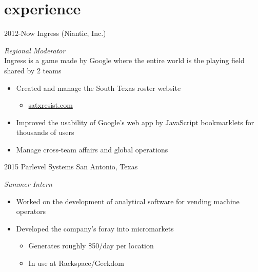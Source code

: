 \documentclass[]{friggeri-cv} %
\begin{document}

\vspace{-.5pt}

\section{experience}


\begin{entrylist}

	\entry
	{2012-Now}
	{Ingress (Niantic, Inc.)}
	{}
	{\emph{Regional Moderator} \\
		Ingress is a game made by Google where the entire world is the playing field shared by 2 teams
		\begin{itemize}
			\item Created and manage the South Texas roster website
				\begin{itemize}
					\item \href{http://satxresist.com}{satxresist.com}
				\end{itemize}
			\item Improved the usability of Google's web app by JavaScript bookmarklets for thousands of users
			\item Manage cross-team affairs and global operations
		\end{itemize}
	}


	\entry
	{2015}
	{Parlevel Systems}
	{San Antonio, Texas}
	{\emph{Summer Intern}
		\begin{itemize}
			\item Worked on the development of analytical software for vending machine operators
			\item Developed the company's foray into micromarkets
				\begin{itemize}
					\item Generates roughly \$50/day per location
					\item In use at Rackspace/Geekdom
				\end{itemize}
		\end{itemize}
	}

\end{entrylist}
\end{document}
